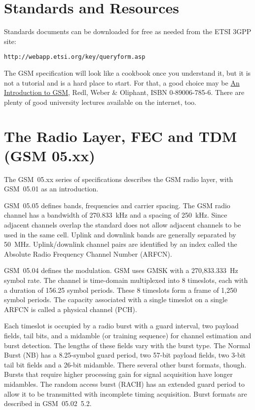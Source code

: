 \documentclass[11pt]{book}
\begin{document}
\section{Standards and Resources}
Standards documents can be downloaded for free as needed from the ETSI 3GPP site:
\begin{verbatim}
http://webapp.etsi.org/key/queryform.asp
\end{verbatim}
The GSM specification will look like a cookbook once you understand it, but it is not a tutorial and is a hard place to start. For that, a good choice may be \underline{An Introduction to GSM}, Redl, Weber \& Oliphant, ISBN 0-89006-785-6.  There are plenty of good university lectures available on the internet, too.


\section{The Radio Layer, FEC and TDM (GSM 05.xx)}
\label{sec:RadioLayer}

The GSM~05.xx series of specifications describes the GSM radio layer, with GSM~05.01 as an introduction.

GSM~05.05 defines bands, frequencies and carrier spacing. The GSM radio channel has a bandwidth of 270.833~kHz and a spacing of 250~kHz. Since adjacent channels overlap the standard does not allow adjacent channels to be used in the same cell. Uplink and downlink bands are generally separated by 50~MHz. Uplink/downlink channel pairs are identified by an index called the Absolute Radio Frequency Channel Number (ARFCN).

GSM~05.04 defines the modulation. GSM uses GMSK with a 270,833.333~Hz symbol rate. The channel is time-domain multiplexed into 8 timeslots, each with a duration of 156.25 symbol periods. These 8 timeslots form a frame of 1,250 symbol periods. The capacity associated with a single timeslot on a single ARFCN is called a physical channel (PCH).

Each timeslot is occupied by a radio burst with a guard interval, two payload fields, tail bits, and a midamble (or training sequence) for channel estimation and burst detection. The lengths of these fields vary with the burst type. The Normal Burst (NB) has a 8.25-symbol guard period, two 57-bit payload fields, two 3-bit tail bit fields and a 26-bit midamble. There several other burst formats, though. Bursts that require higher processing gain for signal acquisition have longer midambles. The random access burst (RACH) has an extended guard period to allow it to be transmitted with incomplete timing acquisition. Burst formats are described in GSM~05.02~5.2.
\end{document}
